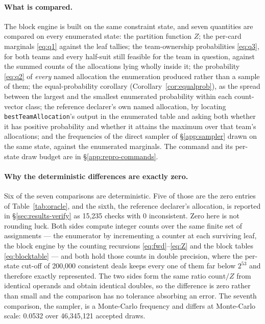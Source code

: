 \documentclass[11pt]{article}
\theoremstyle{definition}
\newcommand{\numOracleBestChecks}{15{,}235}
\newcommand{\numOracleBestBad}{0}
\newcommand{\numOracleSampleDiff}{0.0532}
\newcommand{\numOracleDraws}{46{,}345{,}121}
\newcommand{\numOracleMaxDeals}{200{,}000}
\begin{document}
\paragraph{What is compared.} The block engine is built on the same constraint
state, and seven quantities are compared on every enumerated state: the partition
function $Z$; the per-card marginals \eqref{eq:q1} against the leaf tallies; the
team-ownership probabilities \eqref{eq:q3}, for both teams and every half-suit
still feasible for the team in question, against the summed counts of the
allocations lying wholly inside it; the probability \eqref{eq:q2} of \emph{every}
named allocation the enumeration produced rather than a sample of them; the
equal-probability corollary (Corollary~\ref{cor:equalprob}), as the spread
between the largest and the smallest enumerated probability within each
count-vector class; the reference declarer's own named allocation, by locating
\texttt{bestTeamAllocation}'s output in the enumerated table and asking both
whether it has positive probability and whether it attains the maximum over that
team's allocations; and the frequencies of the direct sampler of
\S\ref{app:sampler} drawn on the same state, against the enumerated marginals.
The command and its per-state draw budget are in \S\ref{app:repro-commands}.

\paragraph{Why the deterministic differences are exactly zero.} Six of the seven
comparisons are deterministic. Five of those are the zero entries of
Table~\ref{tab:oracle}, and the sixth, the reference declarer's allocation, is
reported in \S\ref{sec:results-verify} as \numOracleBestChecks{} checks with
\numOracleBestBad{} inconsistent. Zero here is not rounding luck. Both sides
compute integer counts over the same finite set of assignments --- the enumerator
by incrementing a counter at each surviving leaf, the block engine by the
counting recursions \eqref{eq:fwd}--\eqref{eq:Z} and the block tables
\eqref{eq:blocktable} --- and both hold those counts in double precision, where
the per-state cut-off of \numOracleMaxDeals{} consistent deals keeps every one of
them far below $2^{53}$ and therefore exactly represented. The two sides form the
same ratio
$\text{count}/Z$ from identical operands and obtain identical doubles, so the
difference is zero rather than small and the comparison has no tolerance
absorbing an error. The seventh comparison, the sampler, is a Monte-Carlo
frequency and differs at Monte-Carlo scale: \numOracleSampleDiff{} over
\numOracleDraws{} accepted draws.
\end{document}
